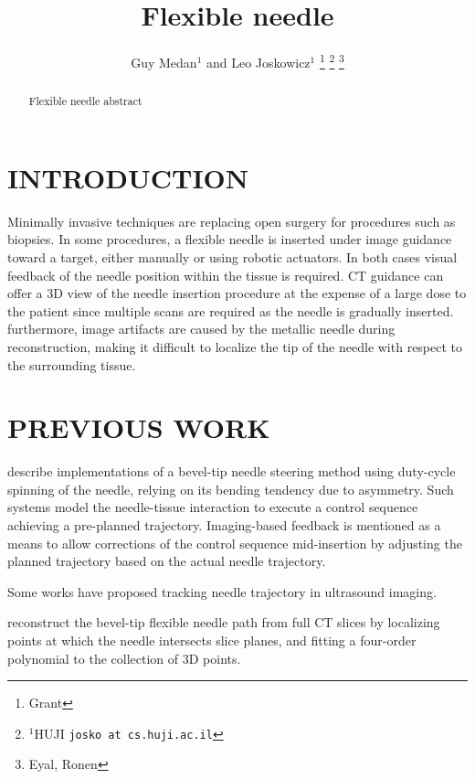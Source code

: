 \documentclass[letterpaper, 10 pt, conference]{ieeeconf}  %
\title{\LARGE \bf
Flexible needle
}
\author{Guy Medan$^{1}$ and Leo Joskowicz$^{1}$%
\thanks{Grant}%
\thanks{$^{1}$HUJI
        {\tt\small josko at cs.huji.ac.il}}%
\thanks{Eyal, Ronen}%
}
\begin{document}
\maketitle
\thispagestyle{empty}
\pagestyle{empty}


\begin{abstract}

Flexible needle abstract

\end{abstract}


\section{INTRODUCTION}

Minimally invasive techniques are replacing open surgery for procedures such as biopsies.
In some procedures, a flexible needle is inserted under image guidance toward a target, either manually or using robotic actuators. In both cases visual feedback of the needle position within the tissue is required. CT guidance can offer a 3D view of the needle insertion procedure at the expense of a large dose to the patient since multiple scans are required as the needle is gradually inserted. furthermore, image artifacts are caused by the metallic needle during reconstruction, making it difficult to localize the tip of the needle with respect to the surrounding tissue.



\section{PREVIOUS WORK}

\cite{wu2013automatic} \cite{engh2010percutaneous} describe implementations of a bevel-tip needle steering method using duty-cycle spinning of the needle, relying on its bending tendency due to asymmetry. Such systems model the needle-tissue interaction to execute a control sequence achieving a pre-planned trajectory. Imaging-based feedback is mentioned as a means to allow corrections of the control sequence mid-insertion by adjusting the planned trajectory based on the actual needle trajectory.

Some works have proposed tracking needle trajectory in ultrasound imaging.

\cite{huo2015shape} reconstruct the bevel-tip flexible needle path from full CT slices by localizing points at which the needle intersects slice planes, and fitting a four-order polynomial to the collection of 3D points.
\end{document}
